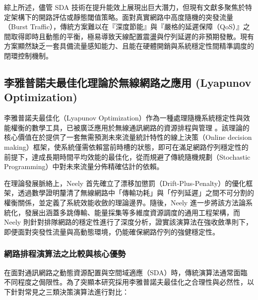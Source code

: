 綜上所述，儘管 SDA 技術在提升能效上展現出巨大潛力，但現有文獻多聚焦於特定架構下的開路評估或靜態閾值策略。面對真實網路中高度隨機的突發流量（Burst Traffic），傳統方案難以在『深度節能』與『嚴格的延遲保障（QoS）』之間取得即時且動態的平衡，極易導致天線配置震盪與佇列延遲的非預期發散。現有方案顯然缺乏一套具備流量感知能力、且能在硬體開銷與系統穩定性間精準調度的閉環控制機制。



\subsection{李雅普諾夫最佳化理論於無線網路之應用 (Lyapunov Optimization)}
李雅普諾夫最佳化（Lyapunov Optimization）作為一種處理隨機系統穩定性與效能權衡的數學工具，已被廣泛應用於無線通訊網路的資源排程與管理 \cite{neely2006energy, neely2010_stochastic}。該理論的核心價值在於提供了一套無需預測未來流量統計特性的線上決策（Online decision making）框架，使系統僅需依賴當前時槽的狀態，即可在滿足網路佇列穩定性的前提下，達成長期時間平均效能的最佳化，從而規避了傳統隨機規劃（Stochastic Programming）中對未來流量分佈精確估計的依賴。

在理論發展脈絡上，Neely \cite{neely2006energy} 首先確立了漂移加懲罰（Drift-Plus-Penalty）的優化框架，透過數學證明釐清了無線網路中「傳輸功耗」與「佇列延遲」之間不可分割的權衡關係，並定義了系統效能收斂的理論邊界。隨後，Neely \cite{neely2010_stochastic} 進一步將該方法論系統化，發展出涵蓋多跳傳輸、能量採集等多維度資源調度的通用工程架構，而 Neely \cite{neely2012_lyapunov} 則針對排隊網路的穩定性進行了深度分析，證實該演算法在強收斂準則下，即便面對突發性流量與高動態環境，仍能確保網路佇列的強健穩定性。

\subsubsection{網路排程演算法之比較與核心優勢}
在面對通訊網路之動態資源配置與空間域適應（SDA）時，傳統演算法通常面臨不同程度之侷限性。為了突顯本研究採用李雅普諾夫最佳化之合理性與必然性，以下針對常見之三類決策演算法進行對比：

